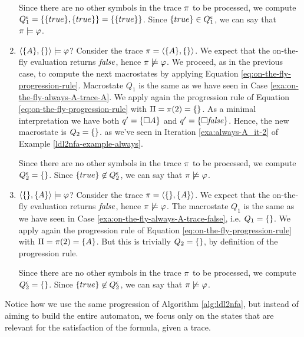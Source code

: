 \begin{example}
\begin{enumerate}
		Since there are no other symbols in the trace $\pi$ to be processed, we compute $Q_1^\epsilon = \{\{true\}, \{true\}\} = \{\{true\}\}$. Since $\{true\} \in Q_1^\epsilon$, we can say that $\pi \models \varphi$.
		
		\item $\langle \{A\}, \{\} \rangle \models \varphi$? Consider the trace $\pi = \langle \{A\}, \{\} \rangle$. We expect that the on-the-fly evaluation returns $\mathit{false}$, hence $\pi \not\models \varphi$. We proceed, as in the previous case, to compute the next macrostates by applying Equation \ref{eq:on-the-fly-progression-rule}. Macrostate $Q_1$ is the same as we have seen in Case \ref{exa:on-the-fly-always-A-trace-A}. 
		We apply again the progression rule of Equation \ref{eq:on-the-fly-progression-rule} with $\Pi = \pi(2) = \{\}$. 
		As a minimal interpretation we have both $q' = \{\Box A\}$ and $q' = \{\Box \mathit{false}\}$. Hence, the new macrostate is $Q_2 = \{\}$. as we've seen in Iteration \ref{exa:always-A_it-2} of Example \ref{ldl2nfa-example-always}.
		
		Since there are no other symbols in the trace $\pi$ to be processed, we compute $Q_2^\epsilon = \{\}$. Since $\{true\} \not\in Q_2^\epsilon$, we can say that $\pi \not\models \varphi$.
		
		\item $\langle \{\}, \{A\} \rangle \models \varphi$? Consider the trace $\pi = \langle \{\}, \{A\} \rangle$. We expect that the on-the-fly evaluation returns $\mathit{false}$, hence $\pi \not\models \varphi$. The macrostate $Q_1$ is the same as we have seen in Case \ref{exa:on-the-fly-always-A-trace-false}, i.e. $Q_1 = \{\}$. 
		We apply again the progression rule of Equation \ref{eq:on-the-fly-progression-rule} with $\Pi = \pi(2) = \{A\}$. But this is trivially $Q_2 = \{\}$, by definition of the progression rule.
		
		Since there are no other symbols in the trace $\pi$ to be processed, we compute $Q_2^\epsilon = \{\}$. Since $\{true\} \not\in Q_2^\epsilon$, we can say that $\pi \not\models \varphi$.
		
	\end{enumerate}	
	Notice how we use the same progression of Algorithm \ref{alg:ldl2nfa}, but instead of aiming to build the entire automaton, we focus only on the states that are relevant for the satisfaction of the formula, given a trace.
	
\end{example}

